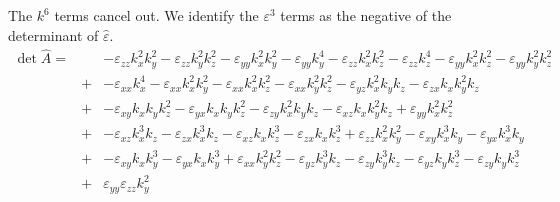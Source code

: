 \documentclass[12pt,a4paper,twoside,openright,BCOR10mm,headsepline,titlepage,abstracton,chapterprefix,final]{scrreprt}
\newcommand\wavenumber{k}
\newcommand\Tensor[1]{\hat{#1}}
\newcommand\permittivity{\Tensor{\scalarpermittivity}}
\newcommand\scalarpermittivity{\varepsilon}
\begin{document}
The $\wavenumber^6$ terms cancel out. We identify the $\scalarpermittivity^3$ terms as the negative of the determinant of $\permittivity$.
\begin{eqnarray}
 \det \hat{A} =&& 
    - \scalarpermittivity_{zz} \wavenumber_x^2 \wavenumber_y^2 - \scalarpermittivity_{zz} \wavenumber_y^2 \wavenumber_z^2 - \scalarpermittivity_{yy} \wavenumber_x^2 \wavenumber_y^2 - \scalarpermittivity_{yy} \wavenumber_y^4 
    - \scalarpermittivity_{zz} \wavenumber_x^2 \wavenumber_z^2 - \scalarpermittivity_{zz} \wavenumber_z^4 - \scalarpermittivity_{yy} \wavenumber_x^2 \wavenumber_z^2 - \scalarpermittivity_{yy} \wavenumber_y^2 \wavenumber_z^2 
 \nonumber\\&+& 
    - \scalarpermittivity_{xx} \wavenumber_x^4 - \scalarpermittivity_{xx} \wavenumber_x^2 \wavenumber_y^2 - \scalarpermittivity_{xx} \wavenumber_x^2 \wavenumber_z^2 - \scalarpermittivity_{xx} \wavenumber_y^2 \wavenumber_z^2  
    - \scalarpermittivity_{yz} \wavenumber_x^2 \wavenumber_y \wavenumber_z - \scalarpermittivity_{zx} \wavenumber_x \wavenumber_y^2 \wavenumber_z  
 \nonumber\\&+&   
    -  \scalarpermittivity_{xy} \wavenumber_x \wavenumber_y \wavenumber_z^2  
    - \scalarpermittivity_{yx} \wavenumber_x \wavenumber_y \wavenumber_z^2 - \scalarpermittivity_{zy} \wavenumber_x^2 \wavenumber_y \wavenumber_z  
    -  \scalarpermittivity_{xz} \wavenumber_x \wavenumber_y^2 \wavenumber_z   
    +  \scalarpermittivity_{yy} \wavenumber_x^2 \wavenumber_z^2  
 \nonumber\\&+&
    - \scalarpermittivity_{xz} \wavenumber_x^3 \wavenumber_z - \scalarpermittivity_{zx} \wavenumber_x^3 \wavenumber_z 
    - \scalarpermittivity_{xz} \wavenumber_x \wavenumber_z^3 - \scalarpermittivity_{zx} \wavenumber_x \wavenumber_z^3  
    +  \scalarpermittivity_{zz} \wavenumber_x^2 \wavenumber_y^2  
    - \scalarpermittivity_{xy} \wavenumber_x^3 \wavenumber_y - \scalarpermittivity_{yx} \wavenumber_x^3 \wavenumber_y  
 \nonumber\\&+&
    - \scalarpermittivity_{xy} \wavenumber_x \wavenumber_y^3 - \scalarpermittivity_{yx} \wavenumber_x \wavenumber_y^3 
    +  \scalarpermittivity_{xx} \wavenumber_y^2 \wavenumber_z^2  
    - \scalarpermittivity_{yz} \wavenumber_y^3 \wavenumber_z - \scalarpermittivity_{zy} \wavenumber_y^3 \wavenumber_z  
    - \scalarpermittivity_{yz} \wavenumber_y \wavenumber_z^3 - \scalarpermittivity_{zy} \wavenumber_y \wavenumber_z^3  
 \nonumber\\[2ex]
 &+& 
       \scalarpermittivity_{yy} \scalarpermittivity_{zz} \wavenumber_y^2 

\end{eqnarray}
\end{document}
